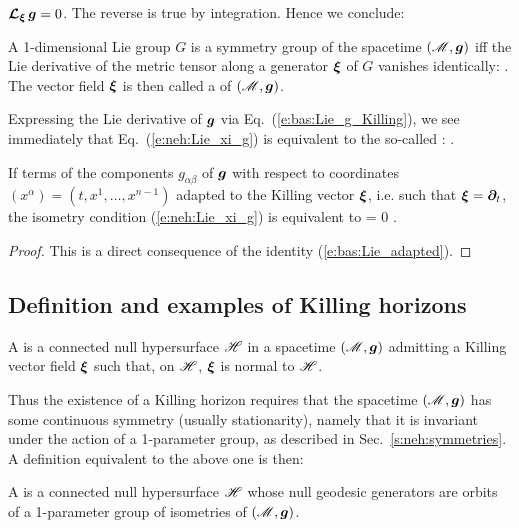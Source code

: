$\bm{\mathcal{L}}_{\bm{\xi}}\,\bm{g} = 0$. The reverse is true by integration. Hence
we conclude:
\begin{prop}
A 1-dimensional Lie group $G$
is a symmetry group of the spacetime $(\mathscr{M},\bm{g})$ iff the Lie derivative
of the metric tensor along a generator $\bm{\xi}$ of $G$
vanishes identically:
\be \label{e:neh:Lie_xi_g}
     .
\ee
The vector field $\bm{\xi}$ is then called a 
of $(\mathscr{M},\bm{g})$.
\end{prop}
Expressing the Lie derivative of $\bm{g}$ via Eq.~(\ref{e:bas:Lie_g_Killing}),
we see immediately that Eq.~(\ref{e:neh:Lie_xi_g}) is equivalent to the so-called
:
\be \label{e:neh:Killing_equation}
    .
\ee

If terms of the components $g_{\alpha\beta}$ of $\bm{g}$ with respect to
coordinates $(x^\alpha) = (t,x^1,\ldots,x^{n-1})$ adapted to the Killing vector $\bm{\xi}$,
i.e. such that $\bm{\xi} = \bm{\partial}_t$, the isometry condition (\ref{e:neh:Lie_xi_g})
is equivalent to
\be \label{e:neh:dgabdt_zero}
     = 0 .
\ee
\begin{proof}
This is a direct consequence of the identity (\ref{e:bas:Lie_adapted}).
\end{proof}


\subsection{Definition and examples of Killing horizons} \label{s:neh:def_Killing_hor}

\begin{greybox}
A  is
a connected null hypersurface $\mathscr{H}$ in a spacetime $(\mathscr{M},\bm{g})$ admitting a
Killing vector field $\bm{\xi}$ such that, on $\mathscr{H}$, $\bm{\xi}$ is
normal to $\mathscr{H}$.
\end{greybox}

Thus the existence of a Killing horizon requires that the spacetime $(\mathscr{M},\bm{g})$ has
some continuous symmetry
(usually stationarity), namely that it is invariant under the action of a
1-parameter group, as described in Sec.~\ref{s:neh:symmetries}.
A definition equivalent to the above one is then:
\begin{greybox}
A  is a connected null
hypersurface $\mathscr{H}$ whose null geodesic generators are orbits of a
1-parameter group of isometries of $(\mathscr{M},\bm{g})$.
\end{greybox}

